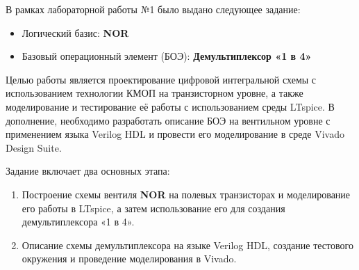 В рамках лабораторной работы №1 было выдано следующее задание:

\begin{itemize}
    \item Логический базис: \textbf{NOR}
    \item Базовый операционный элемент (БОЭ): \textbf{Демультиплексор «1 в 4»}
\end{itemize}

Целью работы является проектирование цифровой интегральной схемы с использованием технологии КМОП на транзисторном уровне, а также моделирование и тестирование её работы с использованием среды LTspice. В дополнение, необходимо разработать описание БОЭ на вентильном уровне с применением языка Verilog HDL и провести его моделирование в среде Vivado Design Suite.

Задание включает два основных этапа:
\begin{enumerate}
    \item Построение схемы вентиля \textbf{NOR} на полевых транзисторах и моделирование его работы в LTspice, а затем использование его для создания демультиплексора «1 в 4».
    \item Описание схемы демультиплексора на языке Verilog HDL, создание тестового окружения и проведение моделирования в Vivado.
\end{enumerate}
